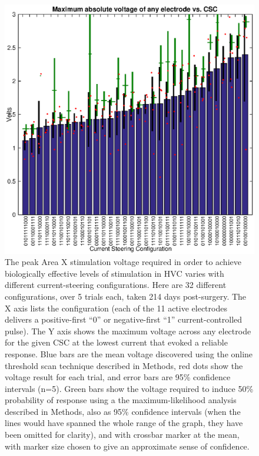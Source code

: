 \documentclass[10pt,letterpaper]{article}
\begin{document}
\begin{figure}
  \includegraphics[width=\textwidth]{VoltageVsCSC}
  \caption{The peak Area X stimulation voltage required in order to
    achieve biologically effective levels of stimulation in HVC varies
    with different current-steering configurations.  Here are 32
    different configurations, over 5 trials each, taken 214 days
    post-surgery.  The X axis lists the configuration (each of the 11
    active electrodes delivers a positive-first ``0'' or
    negative-first ``1'' current-controlled pulse).  The Y axis shows
    the maximum voltage across any electrode for the given CSC at the
    lowest current that evoked a reliable response.  Blue bars are the mean voltage discovered using the online threshold scan technique described in Methods, red dots show the
    voltage result for each trial, and error bars are 95\% confidence
    intervals (n=5).  Green bars show the voltage required to induce 50\% probability of response
    using a the maximum-likelihood analysis described in Methods,
    also as 95\% confidence intervals (when the lines would have
    spanned the whole range of the graph, they have been omitted for
    clarity), and with crossbar marker at the mean, with marker size
    chosen to give an approximate sense of confidence.}
  \label{fig:VoltageVsCSC}
\end{figure}
\end{document}
